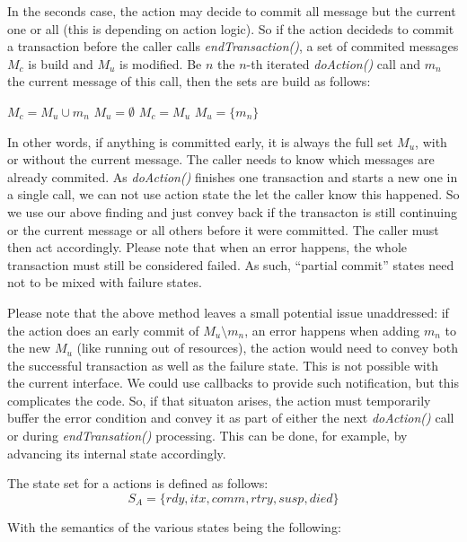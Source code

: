 \documentclass[a4paper,10pt]{article}
\begin{document}
In the seconds case, the action may decide to commit all message but the current one or all (this is depending on action logic). So if the action decideds to commit a transaction before the caller calls \emph{endTransaction()}, a set of commited messages $M_c$ is build and $M_u$ is modified. Be $n$ the $n$-th iterated \emph{doAction()} call and $m_n$ the current message of this call, then the sets are build as follows:

\begin{algorithm}
\begin{algorithmic}
	\STATE $M_c = M_u \cup m_n$
	\STATE $M_u = \emptyset$
\ELSE
	\STATE $M_c = M_u$
	\STATE $M_u = \{ m_n\}$
\ENDIF
\end{algorithmic}
\end{algorithm}

In other words, if anything is committed early, it is always the full set $M_u$, with or without the current message. The caller needs to know which messages are already commited. As \emph{doAction()} finishes one transaction and starts a new one in a single call, we can not use action state the let the caller know this happened. So we use our above finding and just convey back if the transacton is still continuing or the current message or all others before it were committed. The caller must then act accordingly. Please note that when an error happens, the whole transaction must still be considered failed. As such, ``partial commit'' states need not to be mixed with failure states.

Please note that the above method leaves a small potential issue unaddressed: if the action does an early commit of $M_u \setminus m_n$, an error happens when adding $m_n$ to the new $M_u$ (like running out of resources), the action would need to convey both the successful transaction as well as the failure state. This is not possible with the current interface. We could use callbacks to provide such notification, but this complicates the code. So, if that situaton arises, the action must temporarily buffer the error condition and convey it as part of either the next \emph{doAction()} call or during \emph{endTransation()} processing. This can be done, for example, by advancing its internal state accordingly.

The state set for a actions is defined as follows:
$$
S_A = \{ rdy, itx, comm, rtry, susp, died \}
$$

With the semantics of the various states being the following:
\end{document}
